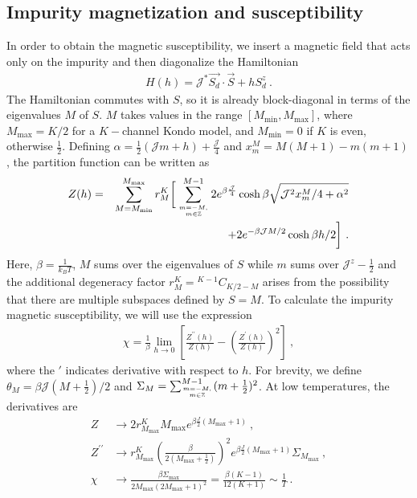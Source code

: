 \documentclass[reprint,prb,superscriptaddress]{revtex4-2}
\begin{document}
\subsection{Impurity magnetization and susceptibility}
\label{sec:imp_suscept}
In order to obtain the magnetic susceptibility, we insert a magnetic field that acts only on the impurity and then diagonalize the Hamiltonian
\begin{align}
	\label{star graph_field_hamiltonian}
	H(h) = {\mathcal{J}^*} \vec{S_d}\cdot\vec{S} + h S_d^z~.
\end{align}
The Hamiltonian commutes with \(S\), so it is already block-diagonal in terms of the eigenvalues \(M\) of \(S\). \(M\) takes values in the range \(\left[M_\text{min}, M_\text{max}\right]\), where \(M_\text{max} = K/2\) for a \(K-\)channel Kondo model, and \(M_\text{min} = 0\)  if \(K\) is even, otherwise \(\frac{1}{2}\). Defining \(\alpha = \frac{1}{2}\left({\mathcal{J}}m + h\right) + \frac{{\mathcal{J}}}{4}\) and \(x^M_m = M(M+1) - m(m+1)\), the partition function can be written as
\begin{eqnarray}
Z(h) &=&\sum_{M=M_\text{min}}^{M_\text{max}}r^K_M\bigg[\sum_{m=-M, \atop{m\in \mathbb{Z}}}^{M-1}2e^{\beta \frac{{\mathcal{J}}}{4}}\cosh \beta\sqrt{{\mathcal{J}}^2x^M_m/4 + \alpha^2} \nonumber\\
&&\hspace{2cm}+ 2e^{-\beta {\mathcal{J}}M/2}\cosh \beta h/2\bigg]~.
\end{eqnarray}
Here, \(\beta = \frac{1}{k_B T}\), \(M\) sums over the eigenvalues of \(S\) while \(m\) sums over \({\mathcal{J}}^z - \frac{1}{2}\) and the additional degeneracy factor \(r^K_M= {}^{K-1}C_{K/2 - M}\) arises from the possibility that there are multiple subspaces defined by \(S=M\). 
To calculate the impurity magnetic susceptibility, we will use the expression
\begin{align}
	\chi = \frac{1}{\beta}\lim_{h \to 0}\left[\frac{Z^{\prime\prime}(h)}{Z(h)} - \left(\frac{Z^{\prime}(h)}{Z(h)}\right)^2 \right] ~,
\end{align}
where the \(\prime\) indicates derivative with respect to \(h\). For brevity, we define \(\theta_M = \beta {\mathcal{J}} (M+\frac{1}{2})/2\) and \(\Sigma_M = \sum_{m=-M, \atop{m\in \mathbb{Z}}}^{M-1}(m+\frac{1}{2})^2\). At low temperatures, the derivatives are 
\begin{align}
	Z &\to 2 r^K_{M_\text{max}} M_\text{max} e^{\beta \frac{J}{2}(M_\text{max} + 1)}~,\\
	Z^{\prime \prime} &\to r^K_{M_\text{max}}\left(\frac{\beta }{2(M_\text{max} + \frac{1}{2})}\right)^2 e^{\beta \frac{J}{2}(M_\text{max} + 1)}\Sigma_{M_\text{max}}~,\\
	\chi &\to \frac{\beta\Sigma_\text{max}}{2M_\text{max}\left(2M_\text{max}+1\right)^2} = \frac{\beta(K-1)}{12(K+1)} \sim \frac{1}{T}~.
\end{align}
\end{document}

